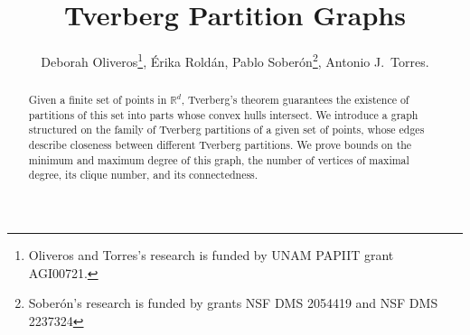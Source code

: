 \documentclass[11pt,a4paper]{article}
\author{Deborah Oliveros\thanks{Oliveros and Torres's research is funded by UNAM PAPIIT grant AGI00721.}, \'Erika Rold\'an, Pablo Sober\'on\thanks{Sober\'on's research is funded by grants NSF DMS 2054419 and NSF DMS 2237324}, Antonio J.\ Torres.}
\title{Tverberg Partition Graphs}
\theoremstyle{plain}
\newtheorem{proposition}{Proposition}
\theoremstyle{definition}
\newcommand{\rr}{\mathds{R}}
\newcommand{\conv}{\operatorname{conv}}
\begin{document}
\maketitle

\begin{abstract}
Given a finite set of points in $\rr^d$, Tverberg's theorem guarantees the existence of partitions of this set into parts whose convex hulls intersect.  We introduce a graph structured on the family of Tverberg partitions of a given set of points, whose edges describe closeness between different Tverberg partitions.  We prove bounds on the minimum and maximum degree of this graph, the number of vertices of maximal degree, its clique number, and its connectedness.
\end{abstract}







\end{document}
